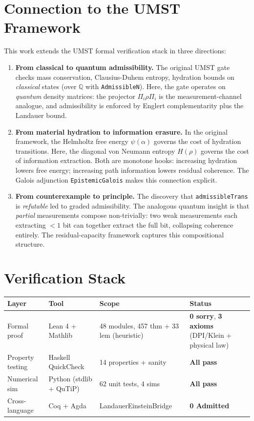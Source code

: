 \documentclass[10pt, a4paper]{article}
\begin{document}
\section{Connection to the UMST Framework}

This work extends the UMST formal verification stack in three directions:

\begin{enumerate}
\item \textbf{From classical to quantum admissibility.} The original UMST gate checks mass conservation, Clausius-Duhem entropy, hydration bounds on \emph{classical} states (over $\mathbb{Q}$ with \texttt{AdmissibleN}). Here, the gate operates on \emph{quantum} density matrices: the projector $\Pi_i \rho \Pi_i$ is the measurement-channel analogue, and admissibility is enforced by Englert complementarity plus the Landauer bound.

\item \textbf{From material hydration to information erasure.} In the original framework, the Helmholtz free energy $\psi(\alpha)$ governs the cost of hydration transitions. Here, the diagonal von Neumann entropy $H(\rho)$ governs the cost of information extraction. Both are monotone hooks: increasing hydration lowers free energy; increasing path information lowers residual coherence. The Galois adjunction \texttt{EpistemicGalois} makes this connection explicit.

\item \textbf{From counterexample to principle.} The discovery that \texttt{admissibleTrans} is \emph{refutable} led to graded admissibility. The analogous quantum insight is that \emph{partial} measurements compose non-trivially: two weak measurements each extracting $< 1$ bit can together extract the full bit, collapsing coherence entirely. The residual-capacity framework captures this compositional structure.
\end{enumerate}

\section{Verification Stack}

{\footnotesize
\begin{tabular}{@{}llll@{}}
\toprule
\textbf{Layer} & \textbf{Tool} & \textbf{Scope} & \textbf{Status} \\
\midrule
Formal proof & Lean 4 + Mathlib & 48 modules, 457 thm + 33 lem (heuristic) & \textbf{0 sorry}, \textbf{3 axioms} (DPI/Klein + physical law) \\
Property testing & Haskell QuickCheck & 14 properties + sanity & \textbf{All pass} \\
Numerical sim & Python (stdlib + QuTiP) & 62 unit tests, 4 sims & \textbf{All pass} \\
Cross-language & Coq + Agda & LandauerEinsteinBridge & \textbf{0 Admitted} \\
\bottomrule
\end{tabular}}
\end{document}
